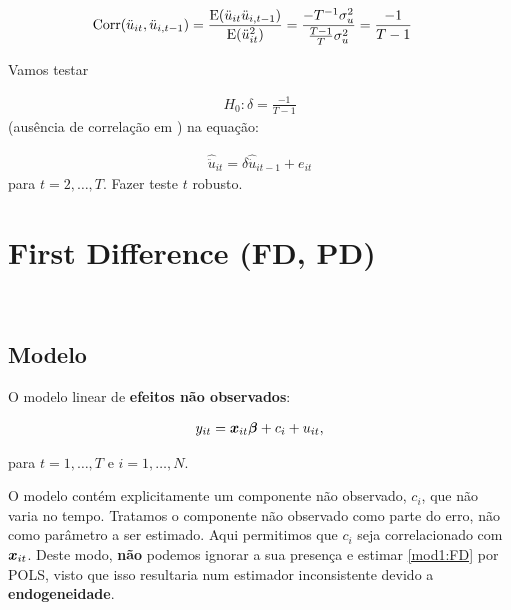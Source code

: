 \documentclass[11pt, oneside, a4paper, article]{article}
\numberwithin{equation}{section}
\begin{document}
\vspace{-1 em} 
\begin{align*}
\text{Corr}( \ddot{u}_{it}, \ddot{u}_{i,t-1} ) &=
\frac{\text{E}( \ddot{u}_{it} \ddot{u}_{i,t-1} )}{\text{E}( \ddot{u}_{it}^2 )} =
\frac{-T^{-1} \sigma_{u}^2}{\frac{T-1}{T}\sigma^2_{u}} = 
\frac{-1}{T-1}
\end{align*}

Vamos testar 

\vspace{-1 em} 
\begin{align*}
H_{0}: \delta = \frac{-1}{T-1}
\end{align*}
(ausência de correlação em \red{$\uvec$}) na equação:

\vspace{-1 em} 
\begin{align*}
	\widehat{\ddot{u}}_{it} = \delta \widehat{\ddot{u}}_{it-1} + e_{it}
\end{align*}
para $t=2, \dots, T$.
Fazer teste $t$ robusto.

\clearpage
\section{First Difference (FD, PD)}
\noindent
\citet[Sec.10.6 -- First Difference Methods, p.279]{wool-2010} \\

\subsection{Modelo}

O modelo linear de \textbf{efeitos não observados}:

\vspace{-1 em}
\begin{align} \label{mod1:FD}
	y_{it} = \boldsymbol{x}_{it} \boldsymbol{\beta} + c_{i} + u_{it},
\end{align}

\noindent
para
$t = 1, \dots, T$ e $i = 1, \dots, N$.

O modelo contém explicitamente um componente não observado, $c_{i}$, que não varia no tempo.
Tratamos o componente não observado como parte do erro, não como parâmetro a ser estimado.
Aqui permitimos que $c_{i}$ seja correlacionado com $\boldsymbol{x}_{it}$.
Deste modo, \textbf{não} podemos ignorar a sua presença e estimar \eqref{mod1:FD} por POLS, visto que isso resultaria num estimador inconsistente devido a \textbf{endogeneidade}.
\end{document}

